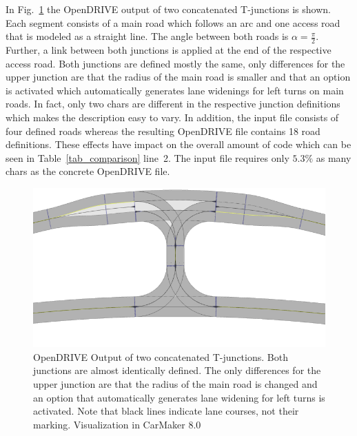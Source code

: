 \documentclass[a4paper, 10pt, conference]{ieeeconf}      %
\begin{document}
In Fig.~\ref{fig_res3_2} the OpenDRIVE output of two concatenated T-junctions is shown. Each segment consists of a main road which follows an arc and one access road that is modeled as a straight line. The angle between both roads is $\alpha=\frac{\pi}{2}$. Further, a link between both junctions is applied at the end of the respective access road. Both junctions are defined mostly the same, only differences for the upper junction are that the radius of the main road is smaller and that an option is activated which automatically generates lane widenings for left turns on main roads. In fact, only two chars are different in the respective junction definitions which makes the description easy to vary. In addition, the input file consists of four defined roads whereas the resulting OpenDRIVE file contains 18 road definitions. These effects have impact on the overall amount of code which can be seen in Table~\ref{tab_comparison} line~2. The input file requires only $5.3\%$ as many chars as the concrete OpenDRIVE file.

\begin{figure}
	\includegraphics[width=\columnwidth]{fig/res3_2.png}
	\caption{OpenDRIVE Output of two concatenated T-junctions. Both junctions are almost identically defined. The only differences for the upper junction are that the radius of the main road is changed and an option that automatically generates lane widening for left turns is activated. Note that black lines indicate lane courses, not their marking. Visualization in CarMaker 8.0}
	\label{fig_res3_2}
\end{figure}
\end{document}
